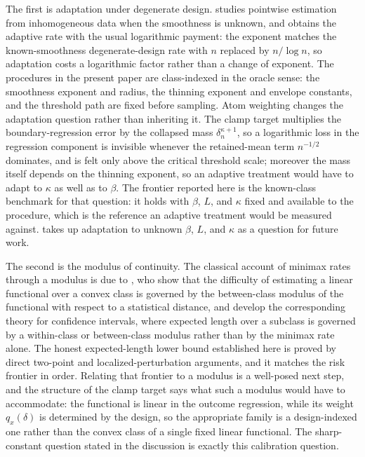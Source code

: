 \documentclass[11pt]{article}
\begin{document}
The first is adaptation under degenerate design.  \citet{Gaiffas2007Inhomogeneous} studies pointwise estimation from inhomogeneous data when the smoothness is unknown, and obtains the adaptive rate with the usual logarithmic payment: the exponent matches the known-smoothness degenerate-design rate with \(n\) replaced by \(n/\log n\), so adaptation costs a logarithmic factor rather than a change of exponent.  The procedures in the present paper are class-indexed in the oracle sense: the smoothness exponent and radius, the thinning exponent and envelope constants, and the threshold path are fixed before sampling.  Atom weighting changes the adaptation question rather than inheriting it.  The clamp target multiplies the boundary-regression error by the collapsed mass \(\delta_n^{\kappa+1}\), so a logarithmic loss in the regression component is invisible whenever the retained-mean term \(n^{-1/2}\) dominates, and is felt only above the critical threshold scale; moreover the mass itself depends on the thinning exponent, so an adaptive treatment would have to adapt to \(\kappa\) as well as to \(\beta\).  The frontier reported here is the known-class benchmark for that question: it holds with \(\beta\), \(L\), and \(\kappa\) fixed and available to the procedure, which is the reference an adaptive treatment would be measured against.   takes up adaptation to unknown \(\beta\), \(L\), and \(\kappa\) as a question for future work.

The second is the modulus of continuity.  The classical account of minimax rates through a modulus is due to \citet{DonohoLiu1991GeometrizingII}, who show that the difficulty of estimating a linear functional over a convex class is governed by the between-class modulus of the functional with respect to a statistical distance, and \citet{CaiLow2004AdaptationTheory} develop the corresponding theory for confidence intervals, where expected length over a subclass is governed by a within-class or between-class modulus rather than by the minimax rate alone.  The honest expected-length lower bound established here is proved by direct two-point and localized-perturbation arguments, and it matches the risk frontier in order.  Relating that frontier to a modulus is a well-posed next step, and the structure of the clamp target says what such a modulus would have to accommodate: the functional is linear in the outcome regression, while its weight \(q_x(\delta)\) is determined by the design, so the appropriate family is a design-indexed one rather than the convex class of a single fixed linear functional.  The sharp-constant question stated in the discussion is exactly this calibration question.
\end{document}
